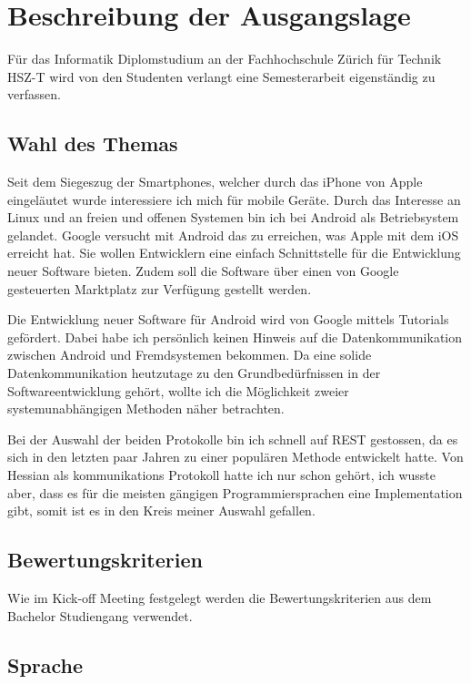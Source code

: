 \documentclass[abstracton, listof=totocnumbered,
bibliography=totocnumbered]{scrreprt}
\begin{document}
  \chapter{Beschreibung der Ausgangslage}
  
  Für das Informatik Diplomstudium an der Fachhochschule Zürich für Technik
  HSZ-T wird von den Studenten verlangt eine Semesterarbeit eigenständig zu
  verfassen.
  
  \section{Wahl des Themas}
  
  Seit dem Siegeszug der Smartphones, welcher durch das iPhone von Apple
  eingeläutet wurde interessiere ich mich für mobile Geräte. Durch das
  Interesse an Linux und an freien und offenen Systemen bin ich bei Android als
  Betriebsystem gelandet. Google versucht mit Android das zu erreichen, was
  Apple mit dem iOS erreicht hat. Sie wollen Entwicklern eine einfach
  Schnittstelle für die Entwicklung neuer Software bieten. Zudem soll die
  Software über einen von Google gesteuerten Marktplatz zur Verfügung gestellt
  werden.
  
  Die Entwicklung neuer Software für Android wird von Google mittels Tutorials
  gefördert. Dabei habe ich persönlich keinen Hinweis auf die Datenkommunikation
  zwischen Android und Fremdsystemen bekommen. Da eine solide
  Datenkommunikation heutzutage zu den Grundbedürfnissen in der
  Softwareentwicklung gehört, wollte ich die Möglichkeit zweier
  systemunabhängigen Methoden näher betrachten.
  
  Bei der Auswahl der beiden Protokolle bin ich schnell auf \ac{REST} gestossen,
  da es sich in den letzten paar Jahren zu einer populären Methode entwickelt
  hatte. Von Hessian als kommunikations Protokoll hatte ich nur schon gehört,
  ich wusste aber, dass es für die meisten gängigen Programmiersprachen eine
  Implementation gibt, somit ist es in den Kreis meiner Auswahl gefallen.
  
  \section{Bewertungskriterien}
  
  Wie im Kick-off Meeting festgelegt werden die Bewertungskriterien aus dem
  Bachelor Studiengang verwendet. 
  
  \section{Sprache}
  
\end{document}
